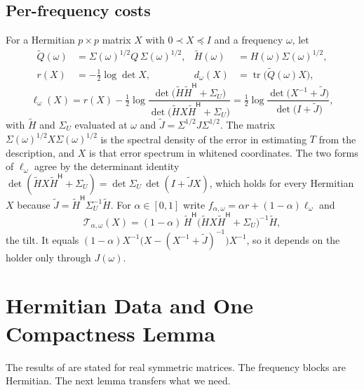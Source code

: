 \documentclass[11pt,onecolumn]{IEEEtran}
\newcommand{\tr}{\operatorname{tr}}
\newcommand{\tQ}{\tilde Q}
\newcommand{\tH}{\tilde H}
\newcommand{\herm}{\mathsf H}
\begin{document}
\subsection{Per-frequency costs}

For a Hermitian $p\times p$ matrix $X$ with $0\prec X\preceq I$ and a
frequency $\omega$, let
\begin{align*}
\tQ(\omega)&=\Sigma(\omega)^{1/2}Q\,\Sigma(\omega)^{1/2},&
\tH(\omega)&=H(\omega)\Sigma(\omega)^{1/2},\\
r(X)&=-\tfrac12\log\det X,&
d_\omega(X)&=\tr\bigl(\tQ(\omega)X\bigr),
\end{align*}
\begin{equation}
\ell_\omega(X)=r(X)-\tfrac12\log\frac{\det\bigl(\tH\tH^{\herm}+\Sigma_U\bigr)}{\det\bigl(\tH X\tH^{\herm}+\Sigma_U\bigr)}
=\tfrac12\log\frac{\det\bigl(X^{-1}+\tilde J\bigr)}{\det\bigl(I+\tilde J\bigr)},
\label{eq:ell}
\end{equation}
with $\tH$ and $\Sigma_U$ evaluated at $\omega$ and
$\tilde J=\Sigma^{1/2}J\Sigma^{1/2}$. The matrix
$\Sigma(\omega)^{1/2}X\Sigma(\omega)^{1/2}$ is the spectral density of the
error in estimating $T$ from the description, and $X$ is that error
spectrum in whitened coordinates. The two forms of $\ell_\omega$ agree by
the determinant identity
$\det(\tH X\tH^{\herm}+\Sigma_U)=\det\Sigma_U\,\det(I+\tilde JX)$, which
holds for every Hermitian $X$ because
$\tilde J=\tH^{\herm}\Sigma_U^{-1}\tH$. For
$\alpha\in[0,1]$ write
$f_{\alpha,\omega}=\alpha r+(1-\alpha)\ell_\omega$ and
\begin{equation}
\mathcal T_{\alpha,\omega}(X)=(1-\alpha)\,\tH^{\herm}\bigl(\tH X\tH^{\herm}+\Sigma_U\bigr)^{-1}\tH ,
\label{eq:tilt}
\end{equation}
the tilt. It equals $(1-\alpha)X^{-1}\bigl(X-(X^{-1}+\tilde J)^{-1}\bigr)X^{-1}$,
so it depends on the holder only through $J(\omega)$.

\section{Hermitian Data and One Compactness Lemma}
\label{sec:tools}

The results of \cite{part1} are stated for real symmetric matrices. The
frequency blocks are Hermitian. The next lemma transfers what we need.
\end{document}
